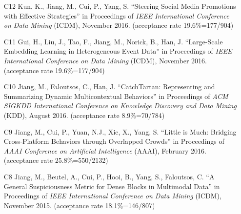 \documentclass[10pt]{article}
\newenvironment{myindentpar}[1]%
{\begin{list}{}%
         {\setlength{\leftmargin}{#1}}%
         \item[]%
}
{\end{list}}
\newcounter{list}
\begin{document}
\begin{myindentpar}{0.00cm}
\begin{enumerate}[leftmargin=.5cm]
\item[C12] Kun, K., Jiang, M., Cui, P., Yang, S. ``Steering Social Media Promotions with Effective Strategies'' in Proceedings of \emph{IEEE International Conference on Data Mining} (ICDM), November 2016. (acceptance rate 19.6\%=177/904)

\vspace{-0.1cm}

\item[C11] Gui, H., Liu, J., Tao, F., Jiang, M., Norick, B., Han, J. ``Large-Scale Embedding Learning in Heterogeneous Event Data'' in Proceedings of \emph{IEEE International Conference on Data Mining} (ICDM), November 2016. (acceptance rate 19.6\%=177/904)

\vspace{-0.1cm}

\item[C10] Jiang, M., Faloutsos, C., Han, J. ``CatchTartan: Representing and Summarizing Dynamic Multicontextual Behaviors'' in Proceedings of \emph{ACM SIGKDD International Conference on Knowledge Discovery and Data Mining} (KDD), August 2016. (acceptance rate 8.9\%=70/784)

\vspace{-0.1cm}

\item[C9] Jiang, M., Cui, P., Yuan, N.J., Xie, X., Yang, S. ``Little is Much: Bridging Cross-Platform Behaviors through Overlapped Crowds'' in Proceedings of \emph{AAAI Conference on Artificial Intelligence} (AAAI), February 2016. (acceptance rate 25.8\%=550/2132)

\vspace{-0.1cm}

\item[C8] Jiang, M., Beutel, A., Cui, P., Hooi, B., Yang, S., Faloutsos, C. ``A General Suspiciousness Metric for Dense Blocks in Multimodal Data'' in Proceedings of \emph{IEEE International Conference on Data Mining} (ICDM), November 2015. (acceptance rate 18.1\%=146/807)


\end{enumerate}
\end{myindentpar}
\end{document}

